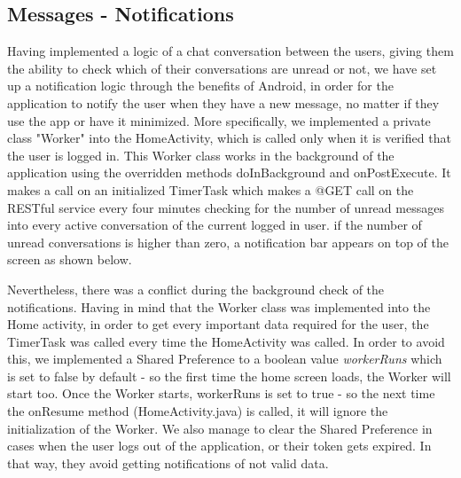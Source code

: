 \documentclass[12pt]{article}
\begin{document}
	\subsection{Messages - Notifications}
	Having implemented a logic of a chat conversation between the users, giving them the ability to check which of their conversations are unread or not, we have set up a notification logic through the benefits of Android, in order for the application to notify the user when they have a new message, no matter if they use the app or have it minimized. More specifically, we implemented a private class "Worker" into the HomeActivity, which is called only when it is verified that the user is logged in. This Worker class works in the background of the application using the overridden methods doInBackground and onPostExecute. It makes a call on an initialized TimerTask which makes a @GET call on the RESTful service every four minutes checking for the number of unread messages into every active conversation of the current logged in user. if the number of unread conversations is higher than zero, a notification bar appears on top of the screen as shown below.
    
    Nevertheless, there was a conflict during the background check of the notifications. Having in mind that the Worker class was implemented into the Home activity, in order to get every important data required for the user, the TimerTask was called every time the HomeActivity was called. In order to avoid this, we implemented a Shared Preference to a boolean value \textit{workerRuns} which is set to false by default - so the first time the home screen loads, the Worker will start too. Once the Worker starts, workerRuns is set to true - so the next time the onResume method (HomeActivity.java) is called, it will ignore the initialization of the Worker. We also manage to clear the Shared Preference in cases when the user logs out of the application, or their token gets expired. In that way, they avoid getting notifications of not valid data.
	
\end{document}

